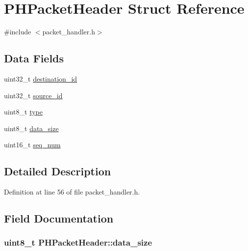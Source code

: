 \hypertarget{struct_p_h_packet_header}{\section{\-P\-H\-Packet\-Header \-Struct \-Reference}
\label{struct_p_h_packet_header}
}


{\ttfamily \#include $<$packet\-\_\-handler.\-h$>$}

\subsection*{\-Data \-Fields}
\begin{DoxyCompactItemize}
\item 
uint32\-\_\-t \hyperlink{struct_p_h_packet_header_a19915477b7c7c9c24b293ba4db7c6426}{destination\-\_\-id}
\item 
uint32\-\_\-t \hyperlink{struct_p_h_packet_header_a93bf1fc396b4d98f870fee75682423b7}{source\-\_\-id}
\item 
uint8\-\_\-t \hyperlink{struct_p_h_packet_header_ad816b782c8c40b9e03bdf092fd37bb3c}{type}
\item 
uint8\-\_\-t \hyperlink{struct_p_h_packet_header_ab8dbaddf1009694724c1f40b82bcb314}{data\-\_\-size}
\item 
uint16\-\_\-t \hyperlink{struct_p_h_packet_header_a3d0a8a439dadc33b716f7e926a9546cf}{seq\-\_\-num}
\end{DoxyCompactItemize}


\subsection{\-Detailed \-Description}


\-Definition at line 56 of file packet\-\_\-handler.\-h.



\subsection{\-Field \-Documentation}
\hypertarget{struct_p_h_packet_header_ab8dbaddf1009694724c1f40b82bcb314}{
\subsubsection[{data\-\_\-size}]{\setlength{\rightskip}{0pt plus 5cm}uint8\-\_\-t {\bf \-P\-H\-Packet\-Header\-::data\-\_\-size}}}\label{struct_p_h_packet_header_ab8dbaddf1009694724c1f40b82bcb314}


